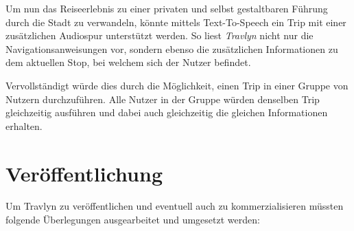 		Um nun das Reiseerlebnis zu einer privaten und selbst gestaltbaren Führung durch die Stadt zu verwandeln, könnte mittels Text-To-Speech ein Trip mit einer zusätzlichen Audiospur unterstützt werden. So liest \textit{Travlyn} nicht nur die Navigationsanweisungen vor, sondern ebenso die zusätzlichen Informationen zu dem aktuellen Stop, bei welchem sich der Nutzer befindet. 
		
		Vervollständigt würde dies durch die Möglichkeit, einen Trip in einer Gruppe von Nutzern durchzuführen. Alle Nutzer in der Gruppe würden denselben Trip gleichzeitig ausführen und dabei auch gleichzeitig die gleichen Informationen erhalten. 
		
	\section{Veröffentlichung}
	
		Um Travlyn zu veröffentlichen und eventuell auch zu kommerzialisieren müssten folgende Überlegungen ausgearbeitet und umgesetzt werden:
		
